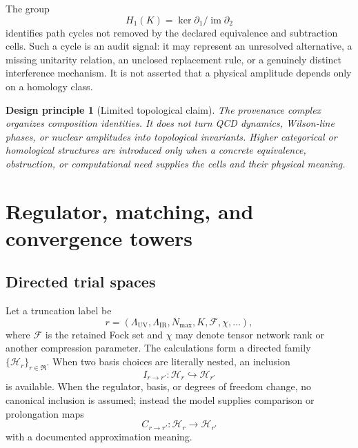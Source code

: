 \documentclass[11pt]{article}
\newtheorem{principle}[definition]{Design principle}
\newcommand{\Hil}{\mathcal H}
\begin{document}
The group
\begin{equation}
 H_1(K)=\ker\partial_1/\operatorname{im}\partial_2
\label{eq:provenance-homology}
\end{equation}
identifies path cycles not removed by the declared equivalence and subtraction
cells.  Such a cycle is an audit signal: it may represent an unresolved
alternative, a missing unitarity relation, an unclosed replacement rule, or a
genuinely distinct interference mechanism.  It is not asserted that a
physical amplitude depends only on a homology class.

\begin{principle}[Limited topological claim]
The provenance complex organizes composition identities.  It does not turn
QCD dynamics, Wilson-line phases, or nuclear amplitudes into topological
invariants.  Higher categorical or homological structures are introduced only
when a concrete equivalence, obstruction, or computational need supplies the
cells and their physical meaning.
\end{principle}

\section{Regulator, matching, and convergence towers}
\label{sec:truncation}

\subsection{Directed trial spaces}

Let a truncation label be
\begin{equation}
 r=(\Lambda_{\mathrm{UV}},\Lambda_{\mathrm{IR}},N_{\max},K,
 \mathcal F,\chi,\ldots),
\label{eq:truncation-label}
\end{equation}
where \(\mathcal F\) is the retained Fock set and \(\chi\) may denote tensor
network rank or another compression parameter.  The calculations form a
directed family \(\{\Hil_r\}_{r\in\mathfrak R}\).  When two basis choices
are literally nested, an inclusion
\begin{equation}
 I_{r\to r'}:\Hil_r\hookrightarrow\Hil_{r'}
\end{equation}
is available.  When the regulator, basis, or degrees of freedom change, no
canonical inclusion is assumed; instead the model supplies comparison or
prolongation maps
\begin{equation}
 C_{r\to r'}:\Hil_r\longrightarrow\Hil_{r'}
\label{eq:state-comparison-map}
\end{equation}
with a documented approximation meaning.
\end{document}
